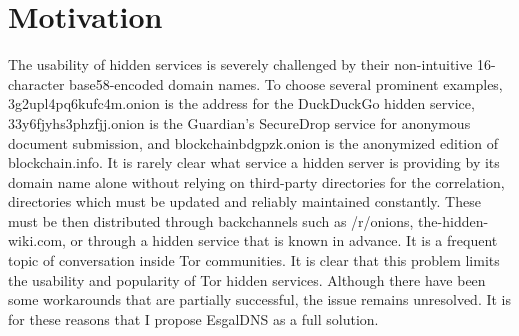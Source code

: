 \section{Motivation}
\label{sec:Motivation}

The usability of hidden services is severely challenged by their non-intuitive 16-character base58-encoded domain names. To choose several prominent examples, 3g2upl4pq6kufc4m.onion is the address for the DuckDuckGo hidden service, 33y6fjyhs3phzfjj.onion is the Guardian's SecureDrop service for anonymous document submission, and blockchainbdgpzk.onion is the anonymized edition of blockchain.info. It is rarely clear what service a hidden server is providing by its domain name alone without relying on third-party directories for the correlation, directories which must be updated and reliably maintained constantly. These must be then distributed through backchannels such as /r/onions, the-hidden-wiki.com, or through a hidden service that is known in advance. It is a frequent topic of conversation inside Tor communities. It is clear that this problem limits the usability and popularity of Tor hidden services. Although there have been some workarounds that are partially successful, the issue remains unresolved. It is for these reasons that I propose EsgalDNS as a full solution.
